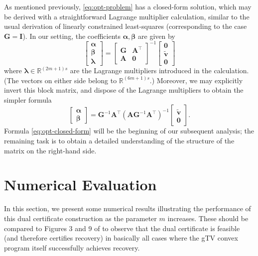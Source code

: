 \documentclass[11pt]{article}
\newcommand{\RR}{\mathbb{R}}
\newcommand{\balpha}{\bm \alpha}
\newcommand{\bbeta}{\bm \beta}
\newcommand{\bA}{\bm A}
\newcommand{\bG}{\bm G}
\newcommand{\bv}{\bm v}
\begin{document}
As mentioned previously, \eqref{eq:opt-problem} has a closed-form solution, which may be derived with a straightforward Lagrange multiplier calculation, similar to the usual derivation of linearly constrained least-squares (corresponding to the case $\bG = \bm I$).
In our setting, the coefficients $\balpha, \bbeta$ are given by
\[ \left[\begin{array}{c} \balpha \\ \bbeta \\ \bm \lambda \end{array}\right] = \left[ \begin{array}{cc} \bG & \bA^\top \\ \bA & \bm 0 \end{array}\right]^{-1}\left[ \begin{array}{c} \bm 0 \\ \tilde{\bv} \\ \bm 0 \end{array}\right] \]
where $\bm \lambda \in \RR^{(2m + 1)s}$ are the Lagrange multipliers introduced in the calculation.
(The vectors on either side belong to $\RR^{(6m + 1)s}$.)
Moreover, we may explicitly invert this block matrix, and dispose of the Lagrange multipliers to obtain the simpler formula
\begin{equation}
    \left[\begin{array}{c} \balpha \\ \bbeta \end{array}\right] = \bG^{-1}\bA^\top(\bA \bG^{-1} \bA^\top)^{-1} \left[\begin{array}{c} \tilde{\bv} \\ \bm 0 \end{array}\right].
    \label{eq:opt-closed-form}
\end{equation}
Formula \eqref{eq:opt-closed-form} will be the beginning of our subsequent analysis; the remaining task is to obtain a detailed understanding of the structure of the matrix on the right-hand side.

\section{Numerical Evaluation}

In this section, we present some numerical results illustrating the performance of this dual certificate construction as the parameter $m$ increases.
These should be compared to Figures 3 and 9 of \cite{fernandez2016super} to observe that the dual certificate is feasible (and therefore certifies recovery) in basically all cases where the \textsf{gTV} convex program itself successfully achieves recovery.
\end{document}
